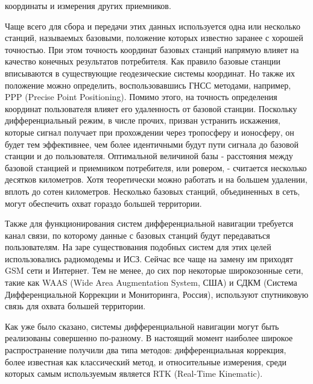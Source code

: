 \documentclass[a4paper,12pt]{report}
\begin{document}
координаты и измерения других приемников. \par
Чаще всего для сбора и передачи этих данных используется одна или несколько станций, называемых 
базовыми, положение которых известно заранее с хорошей точностью. При этом точность координат базовых станций напрямую влияет на качество 
конечных результатов потребителя. Как правило базовые станции вписываются в существующие геодезические системы координат. Но также их 
положение можно определить, воспользовавшись ГНСС методами, например, PPP (Precise Point Positioning). Помимо этого, на точность определения 
координат пользователя влияет его удаленность от базовой станции. Поскольку дифференциальный режим, в числе прочих, призван устранить 
искажения, которые сигнал получает при прохождении через тропосферу и ионосферу, он будет тем эффективнее, чем более идентичными будут пути 
сигнала до базовой станции и до пользователя. Оптимальной величиной базы - расстояния между базовой станцией и приемником потребителя, или 
ровером, - считается несколько десятков километров. Хотя теоретически можно работать и на большем удалении, вплоть до сотен километров. 
Несколько базовых станций, объединенных в сеть, могут обеспечить охват гораздо большей территории. \par
Также для функционирования систем 
дифференциальной навигации требуется канал связи, по которому данные с базовых станций будут передаваться пользователям. На заре существования 
подобных систем для этих целей использовались радиомодемы и ИСЗ. Сейчас все чаще на замену им приходят GSM сети и Интернет. 
Тем не менее, до сих пор некоторые широкозонные сети, такие как WAAS (Wide Area Augmentation System, США) и СДКМ (Система Дифференциальной 
Коррекции и Мониторинга, Россия), используют спутниковую связь для охвата большей территории. \par
Как уже было сказано, системы дифференциальной навигации могут быть реализованы совершенно по-разному. В настоящий момент наиболее широкое 
распространение получили два типа методов: дифференциальная коррекция, более известная как классический метод, и относительные измерения, 
среди которых самым используемым является RTK (Real-Time Kinematic).
\end{document}
